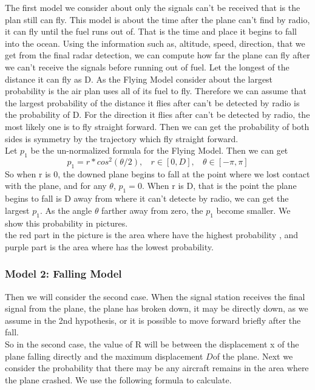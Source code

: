 \documentclass[11pt]{article}
\begin{document}
The first model we consider about only the signals can't be received that is the plan still can fly. This model is about the time after the plane can't find by radio, it can fly until the fuel runs out of. That is the time and place it begins to fall into the ocean. Using the information such as, altitude, speed, direction, that we get from the final radar detection, we can compute how far the plane can fly after we can't receive the  signals before running out of fuel. Let the longest of the distance it can fly as D. As the Flying Model consider about the largest probability is the air plan uses all of its fuel to fly. Therefore we can assume that the largest probability of the  distance it flies after can't be detected by radio is the probability of D. For the direction it flies after can't be detected by radio, the most likely one is to fly straight forward. Then we can get the probability of both sides is symmetry by the trajectory which fly straight forward.\\
Let $p_1$ be the un-normalized formula for the Flying Model. Then we can get
\[p_1=r*cos^2(\theta/2), ~ ~ ~ ~ r\in[0,D], ~ ~ ~ ~ \theta\in[-\pi,\pi]\]
So when r is 0, the downed plane begins to fall at the point where we lost contact with the plane, and for any $\theta$, $p_1=0$. When r is D, that is the point the plane begins to fall is D  away from where it can't detecte by radio, we can get the largest $p_1$. As the angle $\theta$ farther away from zero, the $p_1$ become smaller. We show this probability in pictures.\\
the red part in the picture is the area where have the highest probability , and purple part is the area where has the lowest probability. \\
\begin{center}
    \end{center}
\hypertarget{Model 2: Falling Model}{%
\subsubsection{Model 2: Falling Model}\label{Model 2: Falling Model}}
Then we will consider the second case. When the signal station receives the final signal from the plane, the plane has broken down, it may be directly down, as we assume in the 2nd hypothesis, or it is possible to move forward briefly after the fall.\\
So in the second case, the value of R will be between the displacement x of the plane falling directly and the maximum displacement $D $of the plane. Next we consider the probability that there may be any aircraft remains in the area where the plane crashed. We use the following formula to calculate.\\
\end{document}
